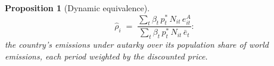 \documentclass[12pt,english]{article}
\newtheorem{proposition}{Proposition}
\theoremstyle{remark}
\begin{document}
\begin{proposition}[Dynamic equivalence]
\begin{equation}
  \hat\rho_i \;=\; \frac{\sum_t \beta_t\,p^*_t\,N_{it}\,e^A_{it}}{\sum_t \beta_t\,p^*_t\,N_{it}\,\bar e_t}:%
  \label{eq:rhohat_dyn}
\end{equation}
the country's emissions under autarky over its population share of world emissions, each period weighted by the discounted price. 
\end{proposition}
\end{document}
